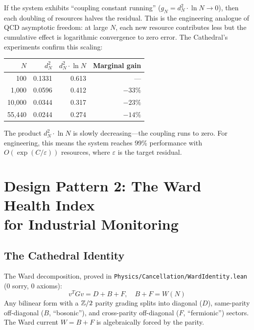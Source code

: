 \documentclass[11pt,a4paper]{article}
\begin{document}
If the system exhibits ``coupling constant running''
($g_N = d^2_N \cdot \ln N \to 0$), then each doubling of resources
halves the residual. This is the engineering analogue of QCD
asymptotic freedom: at large $N$, each new resource contributes
less but the cumulative effect is logarithmic convergence to zero
error. The Cathedral's experiments confirm this scaling:

\begin{center}
\begin{tabular}{@{}rrrr@{}}
\toprule
$N$ & $d^2_N$ & $d^2_N \cdot \ln N$ & Marginal gain \\
\midrule
100 & 0.1331 & 0.613 & --- \\
1{,}000 & 0.0596 & 0.412 & $-33\%$ \\
10{,}000 & 0.0344 & 0.317 & $-23\%$ \\
55{,}440 & 0.0244 & 0.274 & $-14\%$ \\
\bottomrule
\end{tabular}
\end{center}

The product $d^2_N \cdot \ln N$ is slowly decreasing---the coupling
runs to zero. For engineering, this means the system reaches
99\% performance with $O(\exp(C/\varepsilon))$ resources, where
$\varepsilon$ is the target residual.

\section{Design Pattern 2: The Ward Health Index\\
  for Industrial Monitoring}
\label{sec:whi}

\subsection{The Cathedral Identity}

The Ward decomposition, proved in \texttt{Physics/Cancellation/WardIdentity.lean}
(0 sorry, 0 axioms):
\begin{equation}
  v^T G v = D + B + F, \quad B + F = W(N)
\end{equation}
Any bilinear form with a $\mathbb{Z}/2$ parity grading splits into diagonal
($D$), same-parity off-diagonal ($B$, ``bosonic''), and
cross-parity off-diagonal ($F$, ``fermionic'') sectors.
The Ward current $W = B + F$ is algebraically forced by the parity.
\end{document}
